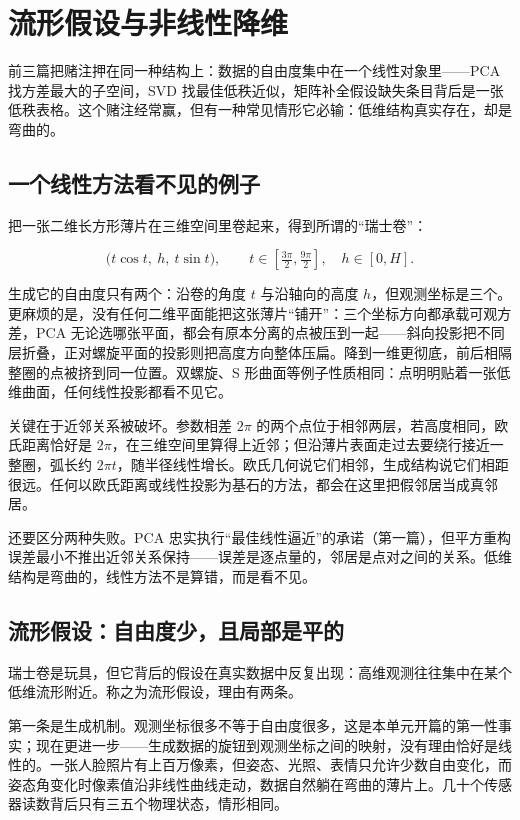 \section{流形假设与非线性降维}

前三篇把赌注押在同一种结构上：数据的自由度集中在一个线性对象里——PCA 找方差最大的子空间，SVD 找最佳低秩近似，矩阵补全假设缺失条目背后是一张低秩表格。这个赌注经常赢，但有一种常见情形它必输：低维结构真实存在，却是弯曲的。

\subsection{一个线性方法看不见的例子}

把一张二维长方形薄片在三维空间里卷起来，得到所谓的``瑞士卷''：

\[
\bigl(t\cos t,\ h,\ t\sin t\bigr),
\qquad
t\in\left[\tfrac{3\pi}{2},\tfrac{9\pi}{2}\right],
\quad h\in[0,H].
\]

生成它的自由度只有两个：沿卷的角度 \(t\) 与沿轴向的高度 \(h\)，但观测坐标是三个。更麻烦的是，没有任何二维平面能把这张薄片``铺开''：三个坐标方向都承载可观方差，PCA 无论选哪张平面，都会有原本分离的点被压到一起——斜向投影把不同层折叠，正对螺旋平面的投影则把高度方向整体压扁。降到一维更彻底，前后相隔整圈的点被挤到同一位置。双螺旋、S 形曲面等例子性质相同：点明明贴着一张低维曲面，任何线性投影都看不见它。

关键在于近邻关系被破坏。参数相差 \(2\pi\) 的两个点位于相邻两层，若高度相同，欧氏距离恰好是 \(2\pi\)，在三维空间里算得上近邻；但沿薄片表面走过去要绕行接近一整圈，弧长约 \(2\pi t\)，随半径线性增长。欧氏几何说它们相邻，生成结构说它们相距很远。任何以欧氏距离或线性投影为基石的方法，都会在这里把假邻居当成真邻居。

还要区分两种失败。PCA 忠实执行``最佳线性逼近''的承诺（第一篇），但平方重构误差最小不推出近邻关系保持——误差是逐点量的，邻居是点对之间的关系。低维结构是弯曲的，线性方法不是算错，而是看不见。

\subsection{流形假设：自由度少，且局部是平的}

瑞士卷是玩具，但它背后的假设在真实数据中反复出现：高维观测往往集中在某个低维流形附近。称之为流形假设，理由有两条。

第一条是生成机制。观测坐标很多不等于自由度很多，这是本单元开篇的第一性事实；现在更进一步——生成数据的旋钮到观测坐标之间的映射，没有理由恰好是线性的。一张人脸照片有上百万像素，但姿态、光照、表情只允许少数自由变化，而姿态角变化时像素值沿非线性曲线走动，数据自然躺在弯曲的薄片上。几十个传感器读数背后只有三五个物理状态，情形相同。

